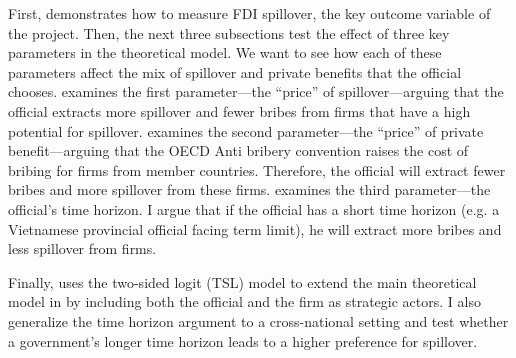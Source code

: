 First,  demonstrates how to measure FDI spillover, the key outcome variable of the project. Then, the next three subsections test the effect of three key parameters in the theoretical model. We want to see how each of these parameters affect the mix of spillover and private benefits that the official chooses.  examines the first parameter---the ``price'' of spillover---arguing that the official extracts more spillover and fewer bribes from firms that have a high potential for spillover.  examines the second parameter---the ``price'' of private benefit---arguing that the OECD Anti bribery convention raises the cost of bribing for firms from member countries. Therefore, the official will extract fewer bribes and more spillover from these firms.  examines the third parameter---the official's time horizon. I argue that if the official has a short time horizon (e.g. a Vietnamese provincial official facing term limit), he will extract more bribes and less spillover from firms.

Finally,  uses the two-sided logit (TSL) model to extend the main theoretical model in  by including both the official and the firm as strategic actors. I also generalize the time horizon argument to a cross-national setting and test whether a government's longer time horizon leads to a higher preference for spillover.